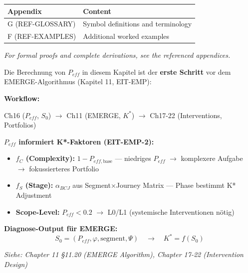 \begin{tcolorbox}[
    colback=yellow!10!white,
    colframe=orange!75!black,
    title={\textbf{Appendix References for This Chapter}},
    fonttitle=\bfseries
]
\small
\begin{tabular}{@{}lp{8cm}@{}}
\textbf{Appendix} & \textbf{Content} \\
\midrule
G (REF-GLOSSARY) & Symbol definitions and terminology \\
F (REF-EXAMPLES) & Additional worked examples \\
\end{tabular}

\medskip
\textit{For formal proofs and complete derivations, see the referenced appendices.}
\end{tcolorbox}

\begin{tcolorbox}[colback=blue!5!white, colframe=blue!75!black,
    title=\textbf{Cross-Reference: $P_{eff}$ als Input für EMERGE (Chapter 11, 17-22)}]

Die Berechnung von $P_{eff}$ in diesem Kapitel ist der \textbf{erste Schritt} vor dem EMERGE-Algorithmus (Kapitel 11, EIT-EMP):

\vspace{0.2cm}
\textbf{Workflow:}
\begin{center}
\small
Ch16 ($P_{eff}$, $S_0$) $\rightarrow$ Ch11 (EMERGE, $K^*$) $\rightarrow$ Ch17-22 (Interventions, Portfolios)
\end{center}

\textbf{$P_{eff}$ informiert K*-Faktoren (EIT-EMP-2):}
\begin{itemize}[nosep]
\item \textbf{$f_C$ (Complexity):} $1 - P_{eff,\text{base}}$ — niedriges $P_{eff}$ $\to$ komplexere Aufgabe $\to$ fokussierteres Portfolio
\item \textbf{$f_S$ (Stage):} $\alpha_{BCJ}$ aus Segment×Journey Matrix — Phase bestimmt K* Adjustment
\item \textbf{Scope-Level:} $P_{eff} < 0.2$ $\to$ L0/L1 (systemische Interventionen nötig)
\end{itemize}

\vspace{0.2cm}
\textbf{Diagnose-Output für EMERGE:}
\begin{equation*}
S_0 = (P_{eff}, \varphi, \text{segment}, \Psi) \quad \rightarrow \quad K^* = f(S_0)
\end{equation*}

\vspace{0.2cm}
\textit{Siehe: Chapter 11 §11.20 (EMERGE Algorithm), Chapter 17-22 (Intervention Design)}
\end{tcolorbox}

